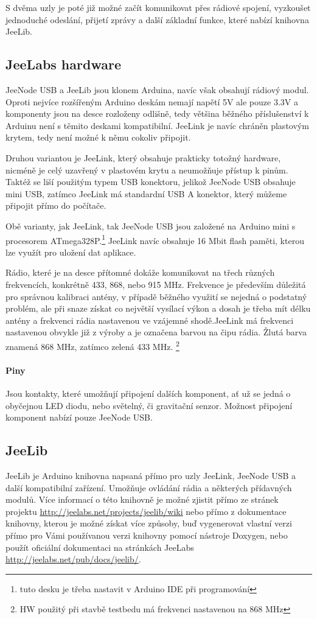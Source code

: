 \documentclass[12pt,titlepage]{article}
\begin{document}
	S dvěma uzly je poté již možné začít komunikovat přes rádiové spojení, vyzkoušet jednoduché odeslání, přijetí zprávy a další základní funkce, které nabízí knihovna JeeLib.


	\subsection{JeeLabs hardware}
		JeeNode USB a JeeLib jsou klonem Arduina, navíc však obsahují rádiový modul. Oproti nejvíce rozšířeným Arduino deskám nemají napětí 5V ale pouze 3.3V  a komponenty jsou na desce rozloženy odlišně, tedy většina běžného příslušenství k Arduinu není s těmito deskami kompatibilní. JeeLink je navíc chráněn plastovým krytem, tedy není možné k němu cokoliv připojit.

		Druhou variantou je JeeLink, který obsahuje prakticky totožný hardware, nicméně je celý uzavřený v plastovém krytu a neumožňuje přístup k pinům. Taktéž se liší použitým typem USB konektoru, jelikož JeeNode USB obsahuje mini USB, zatímco JeeLink má standardní USB A konektor, který můžeme připojit přímo do počítače.

		Obě varianty, jak JeeLink, tak JeeNode USB jsou založené na Arduino mini s procesorem ATmega328P.\footnote{tuto desku je třeba nastavit v Arduino IDE při programování} JeeLink navíc obsahuje 16 Mbit flash paměti, kterou lze využít pro uložení dat aplikace.

		Rádio, které je na desce přítomné dokáže komunikovat na třech různých frekvencích, konkrétně 433, 868, nebo 915 MHz. Frekvence je především důležitá pro správnou kalibraci antény, v případě běžného využití se nejedná o podstatný problém, ale při snaze získat co největší vysílací výkon a dosah je třeba mít délku antény a frekvenci rádia nastavenou ve vzájemné shodě.JeeLink má frekvenci nastavenou obvykle již z výroby a je označena barvou na čipu rádia. Žlutá barva znamená 868 MHz, zatímco zelená 433 MHz. \footnote{HW použitý při stavbě testbedu má frekvenci nastavenou na 868 MHz}
		\paragraph{Piny}

		Jsou kontakty, které umožňují připojení dalších komponent, ať už se jedná o obyčejnou LED diodu, nebo světelný, či gravitační senzor. Možnost připojení komponent nabízí pouze JeeNode USB.

	\subsection{JeeLib}
		JeeLib je Arduino knihovna napsaná přímo pro uzly JeeLink, JeeNode USB a další kompatibilní zařízení. Umožňuje ovládání rádia a některých přídavných modulů. Více informací o této knihovně je možné zjistit přímo ze stránek projektu \url{http://jeelabs.net/projects/jeelib/wiki} nebo přímo z dokumentace knihovny, kterou je možné získat více způsoby, buď vygenerovat vlastní verzi přímo pro Vámi používanou verzi knihovny pomocí nástroje Doxygen, nebo použít oficiální dokumentaci na stránkách JeeLabs \url{http://jeelabs.net/pub/docs/jeelib/}.
\end{document}
